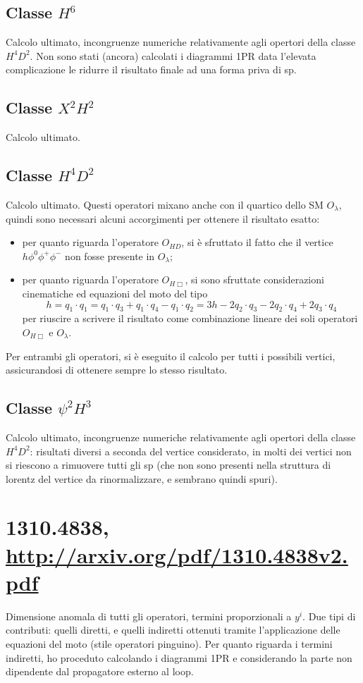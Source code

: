 \documentclass[a4paper,12pt]{article}
\newcommand\la{\lambda}
\newcommand{\beq}{\begin{equation}}
\newcommand{\eeq}{\end{equation}}
\newcommand{\bit}{\begin{itemize}}
\newcommand{\eit}{\end{itemize}}
\newcommand{\itm}{\item[-]}
\begin{document}
\subsection*{Classe $H^6$}
Calcolo ultimato, incongruenze numeriche relativamente agli opertori della classe $H^4D^2$. Non sono stati (ancora) calcolati i diagrammi 1PR data l'elevata complicazione le ridurre il risultato finale ad una forma priva di sp.
\subsection*{Classe $X^2H^2$}
Calcolo ultimato.
\subsection*{Classe $H^4D^2$}
Calcolo ultimato. Questi operatori mixano anche con il quartico dello SM $O_{\la}$, quindi sono necessari alcuni accorgimenti per ottenere il risultato esatto:
\bit
\itm per quanto riguarda l'operatore $O_{HD}$, si è sfruttato il fatto che il vertice $h\phi^0\phi^+\phi^-$ non fosse presente in $O_{\la}$;
\itm per quanto riguarda l'operatore $O_{H\Box}$, si sono sfruttate considerazioni cinematiche ed equazioni del moto del tipo
\beq
h = q_1\cdot q_1 = q_1\cdot q_3 + q_1\cdot q_4 - q_1\cdot q_2 = 3h -2q_2\cdot q_3-2q_2\cdot q_4+2q_3\cdot q_4  \nonumber
\eeq
per riuscire a scrivere il risultato come combinazione lineare dei soli operatori  $O_{H\Box}$ e  $O_{\la}$.
\eit
Per entrambi gli operatori, si è eseguito il calcolo per tutti i possibili vertici, assicurandosi di ottenere sempre lo stesso risultato.
\subsection*{Classe $\psi^2H^3$}
Calcolo ultimato, incongruenze numeriche relativamente agli opertori della classe $H^4D^2$: risultati diversi a seconda del vertice considerato, in molti dei vertici non si riescono a rimuovere tutti gli sp (che non sono presenti nella struttura di lorentz del vertice da rinormalizzare, e sembrano quindi spuri).



\newpage



\section*{1310.4838, \url{http://arxiv.org/pdf/1310.4838v2.pdf}}
Dimensione anomala di tutti gli operatori, termini proporzionali a $y^i$. Due tipi di contributi: quelli diretti, e quelli indiretti ottenuti tramite l'applicazione delle equazioni del moto (stile operatori pinguino). Per quanto riguarda i termini indiretti, ho proceduto calcolando i diagrammi 1PR e considerando la parte non dipendente dal propagatore esterno al loop.
\end{document}

